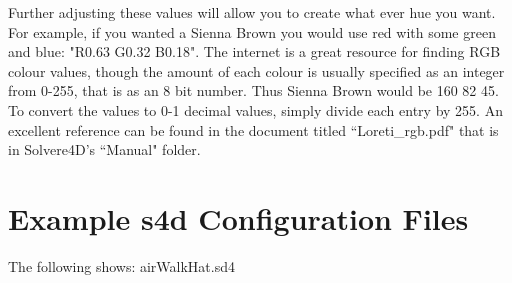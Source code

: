 \documentclass[singlecolumn,12pt]{article}
\begin{document}
\vspace{1cm}

Further adjusting these values will allow you to create what ever
hue you want. For example, if you wanted a Sienna Brown you would
use red with some green and blue: "R0.63 G0.32 B0.18". The internet
is a great resource for finding RGB colour values, though the amount
of each colour is usually specified as an integer from 0-255, that
is as an 8 bit number. Thus Sienna Brown would be 160 82 45. To
convert the values to 0-1 decimal values, simply divide each entry
by 255. An excellent reference can be found in the document titled
``Loreti\_rgb.pdf" that is in Solvere4D's ``Manual" folder.

\section{Example s4d Configuration Files}
\label{app_ex_s4d_Files} The following shows: airWalkHat.sd4
\end{document}
